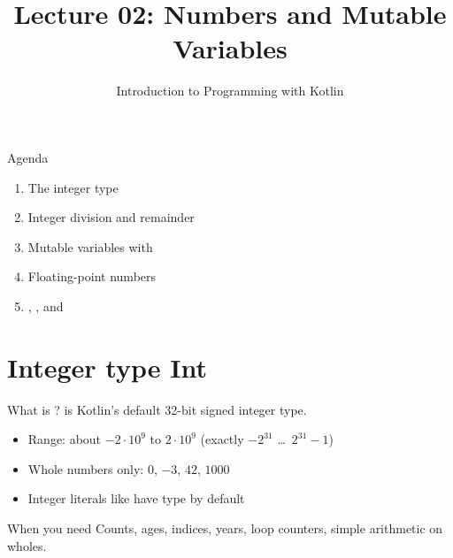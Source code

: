 \documentclass[aspectratio=169,11pt]{beamer}
\title{Lecture 02: Numbers and Mutable Variables}
\subtitle{Introduction to Programming with Kotlin}
\begin{document}
    \begin{frame}
        \titlepage
    \end{frame}

    \begin{frame}{Agenda}
        \begin{enumerate}
            \item The integer type 
            \item Integer division and remainder
            \item Mutable variables with 
            \item Floating-point numbers
            \item {}, , and 
        \end{enumerate}
    \end{frame}

    \section{Integer type Int}

    \begin{frame}{What is ?}
         is Kotlin's default 32-bit signed integer type.
        \vspace{0.6em}
        \begin{itemize}
            \item Range: about $-2\cdot 10^9$ to $2\cdot 10^9$
              (exactly $-2^{31}$ \ldots\ $2^{31}-1$)
            \item Whole numbers only: $0$, $-3$, $42$, $1000$
            \item Integer literals like  have type  by default
        \end{itemize}
        \vspace{0.5em}
        \begin{block}{When you need }
            Counts, ages, indices, years, loop counters, simple arithmetic on wholes.
        \end{block}
    \end{frame}
\end{document}

